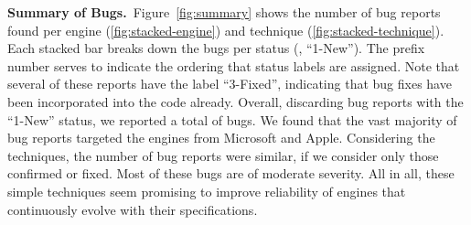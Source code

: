 \documentclass[10pt,conference,anonymous]{IEEEtran}
\begin{document}

\vspace{1ex}
\noindent\textbf{Summary of Bugs.}~Figure~\ref{fig:summary} shows the
number of bug reports found per engine (\ref{fig:stacked-engine}) and
technique (\ref{fig:stacked-technique}). Each stacked bar breaks down
the bugs per status (\eg{}, ``1-New''). The prefix number serves to
indicate the ordering that status labels are assigned. Note that
several of these reports have the label ``3-Fixed'', indicating that
bug fixes have been incorporated into the code already. Overall, discarding bug reports with the
``1-New'' status, we reported a total of \totalBugsConfirmed{}
bugs. We found that the vast majority of bug reports targeted the engines
from Microsoft and Apple. Considering the techniques, the number of
bug reports were similar, if we consider only those confirmed or
fixed. Most of these bugs are of moderate severity. All in all, these
simple techniques seem promising to improve reliability of engines
that continuously evolve with their specifications.

\end{document}
